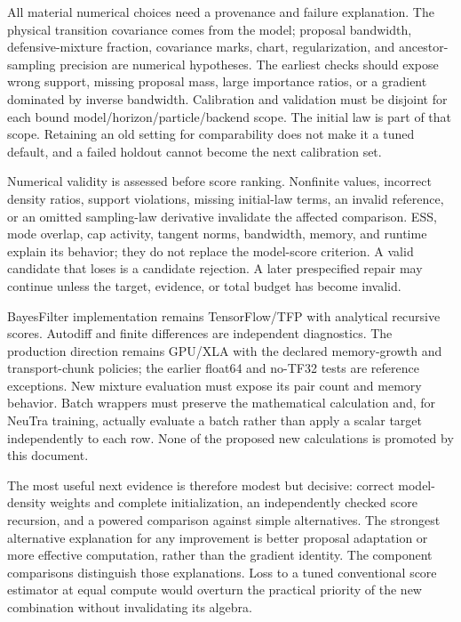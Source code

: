 All material numerical choices need a provenance and failure explanation.
The physical transition covariance comes from the model; proposal bandwidth,
defensive-mixture fraction, covariance marks, chart, regularization, and
ancestor-sampling precision are numerical hypotheses. The earliest checks
should expose wrong support, missing proposal mass, large importance ratios,
or a gradient dominated by inverse bandwidth. Calibration and validation
must be disjoint for each bound model/horizon/particle/backend scope. The
initial law is part of that scope. Retaining an old setting for comparability
does not make it a tuned default, and a failed holdout cannot become the next
calibration set.

Numerical validity is assessed before score ranking. Nonfinite values,
incorrect density ratios, support violations, missing initial-law terms,
an invalid reference, or an omitted sampling-law derivative invalidate the
affected comparison. ESS, mode overlap, cap activity, tangent norms, bandwidth,
memory, and runtime explain its behavior; they do not replace the model-score
criterion. A valid candidate that loses is a candidate rejection. A later
prespecified repair may continue unless the target, evidence, or total budget
has become invalid.

BayesFilter implementation remains TensorFlow/TFP with analytical recursive
scores. Autodiff and finite differences are independent diagnostics. The
production direction remains GPU/XLA with the declared memory-growth and
transport-chunk policies; the earlier float64 and no-TF32 tests are reference
exceptions. New mixture evaluation must expose its pair count and memory
behavior. Batch wrappers must preserve the mathematical calculation and,
for NeuTra training, actually evaluate a batch rather than apply a scalar
target independently to each row. None of the proposed new calculations is
promoted by this document.

The most useful next evidence is therefore modest but decisive: correct
model-density weights and complete initialization, an independently checked
score recursion, and a powered comparison against simple alternatives. The
strongest alternative explanation for any improvement is better proposal
adaptation or more effective computation, rather than the gradient identity.
The component comparisons distinguish those explanations. Loss to a tuned
conventional score estimator at equal compute would overturn the practical
priority of the new combination without invalidating its algebra.
